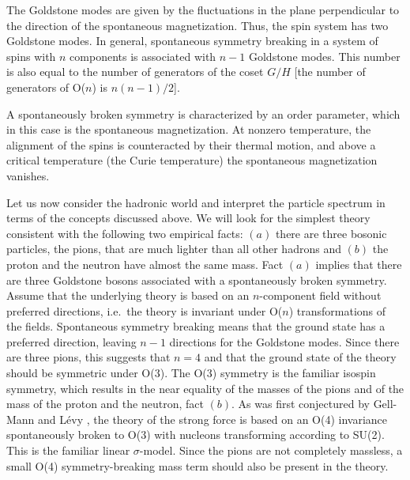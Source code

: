 The Goldstone modes are given by the fluctuations in the plane
perpendicular to the direction of the spontaneous magnetization. Thus,
the spin system has two Goldstone modes. In general,
spontaneous symmetry breaking in a system of spins with $n$ components
is associated with $n-1$ Goldstone modes.  This number is also equal
to the number of generators of the coset $G/H$ [the number of
generators of O($n$) is $n(n-1)/2$].

A spontaneously broken symmetry is characterized by an order
parameter, which in this case is the spontaneous magnetization.  At
nonzero temperature, the alignment of the spins is counteracted by
their thermal motion, and above a critical temperature (the Curie
temperature) the spontaneous magnetization vanishes.

Let us now consider the hadronic world and interpret the particle
spectrum in terms of the concepts discussed above.  We will look for
the simplest theory consistent with the following two empirical facts:
$(a)$ there are three bosonic particles, the pions, that are much
lighter than all other hadrons and $(b)$ the proton and the neutron
have almost the same mass.  Fact $(a)$ implies that there are three
Goldstone bosons associated with a spontaneously broken symmetry.
Assume that the underlying theory is based on an $n$-component field
without preferred directions, i.e.\ the theory is invariant under
O($n$) transformations of the fields.  Spontaneous symmetry breaking
means that the ground state has a preferred direction, leaving $n-1$
directions for the Goldstone modes.  Since there are three pions, this
suggests that $n=4$ and that the ground state of the theory should be
symmetric under O(3).  The O(3) symmetry is the familiar isospin
symmetry, which results in the near equality of the masses of the
pions and of the mass of the proton and the neutron, fact $(b)$. As
was first conjectured by Gell-Mann and L\'evy \cite{chiralgel}, the
theory of the strong force is based on an O(4) invariance
spontaneously broken to O(3) with nucleons transforming according to
SU(2). This is the familiar linear $\sigma$-model.  Since the pions
are not completely massless, a small O(4) symmetry-breaking mass term
should also be present in the theory.

